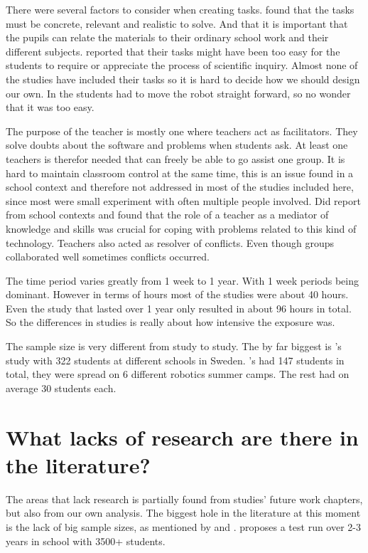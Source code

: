 \bigskip\noindent
There were several factors to consider when creating tasks.  found that the tasks must be concrete, relevant and realistic  to solve. And that it is important that the pupils can relate the materials to their ordinary school work and their different subjects.  reported that their tasks might have been too easy for the students to require or appreciate the process of  scientific inquiry. Almost none of the studies have included their tasks so it is hard to decide how we should design our own. In  the students had to move the robot straight forward, so no wonder that it was too easy.

\bigskip\noindent
The purpose of the teacher is mostly one where teachers act as facilitators. They solve doubts about the software and problems when students ask. At least one teachers is therefor needed that can freely be able to go assist one group. It is hard to maintain classroom control at the same time, this is an issue found in a school context and therefore not addressed in most of the studies included here, since most were small experiment with often multiple people involved.  Did report from school contexts and found that the role of a teacher as a mediator of knowledge and skills was crucial for coping with problems related to this kind of technology. Teachers also acted as resolver of conflicts. Even though groups collaborated well sometimes conflicts occurred. 

\bigskip\noindent
The time period varies greatly from 1 week to 1 year. With 1 week periods being dominant. However in terms of hours most of the studies were about 40 hours. Even the study that lasted over 1 year only resulted in about 96 hours in total. So the differences in studies is really about how intensive the exposure was. 

\bigskip\noindent
The sample size is very different from study to study. The by far biggest is 's study with 322 students at different schools in Sweden. 's had 147 students in total, they were spread on 6 different robotics summer camps. The rest had on average 30 students each.

\section{What lacks of research are there in the literature?}

The areas that lack research is partially found from studies' future work chapters, but also from our own analysis. The biggest hole in the literature at this moment is the lack of big sample sizes, as mentioned by  and . 
 proposes a test run over 2-3 years in school with 3500+ students. 

